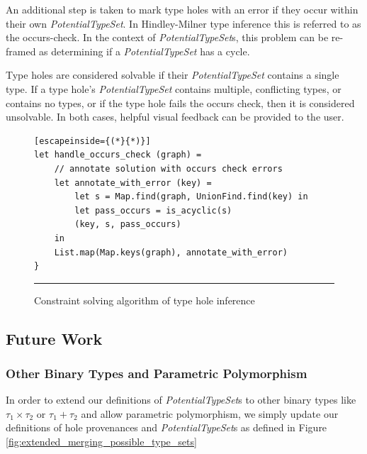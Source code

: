 An additional step is taken to mark type holes with an error if they occur within their own \textit{PotentialTypeSet}. In Hindley-Milner type inference this is referred to as the occurs-check. In the context of \textit{PotentialTypeSet}s, this problem can be re-framed as determining if a \textit{PotentialTypeSet} has a cycle.

Type holes are considered solvable if their \textit{PotentialTypeSet} contains a single type. If a type hole's \textit{PotentialTypeSet} contains multiple, conflicting types, or contains no types, or if the type hole fails the occurs check, then it is considered unsolvable. In both cases, helpful visual feedback can be provided to the user.


\begin{figure}[h!]
\begin{lstlisting}[escapeinside={(*}{*)}]
let handle_occurs_check (graph) =
    // annotate solution with occurs check errors
    let annotate_with_error (key) =
        let s = Map.find(graph, UnionFind.find(key) in
        let pass_occurs = is_acyclic(s)
        (key, s, pass_occurs)
    in
    List.map(Map.keys(graph), annotate_with_error)
}
\end{lstlisting}
\vspace{-4px}
 \hrule
\caption{Constraint solving algorithm of type hole inference}
\label{fig:occurs_check}
\end{figure}

\subsection{Future Work}
\subsubsection{Other Binary Types and Parametric Polymorphism}
In order to extend our definitions of \emph{PotentialTypeSet}s to other binary types like $\tau_1 \times \tau_2$ or $\tau_1 + \tau_2$ and allow parametric polymorphism, we simply update our definitions of hole provenances and \emph{PotentialTypeSet}s as defined in Figure \ref{fig:extended_merging_possible_type_sets}

